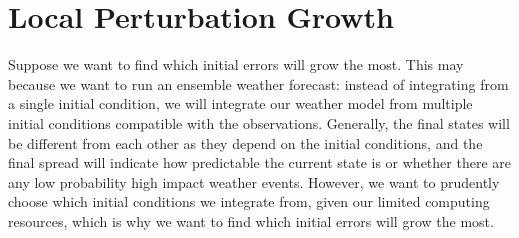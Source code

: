\section{Local Perturbation Growth}

Suppose we want to find which initial errors will grow the most. This may because we want to run an ensemble weather forecast: instead of integrating from a single initial condition, we will integrate our weather model from multiple initial conditions compatible with the observations. Generally, the final states will be different from each other as they depend on the initial conditions, and the final spread will indicate how predictable the current state is or whether there are any low probability high impact weather events. However, we want to prudently choose which initial conditions we integrate from, given our limited computing resources, which is why we want to find which initial errors will grow the most.

